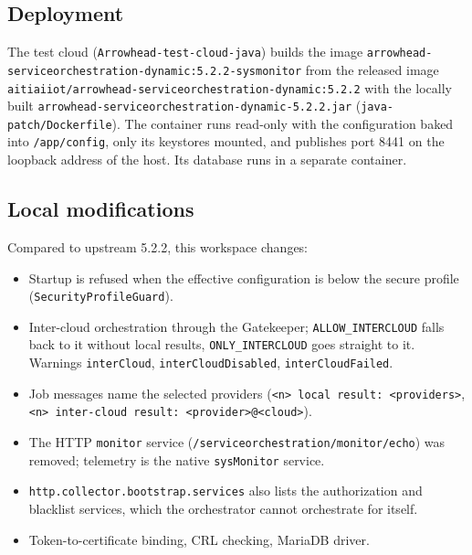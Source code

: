\documentclass[a4paper]{arrowhead}
\begin{document}
\subsection{Deployment}

The test cloud (\texttt{Arrowhead-test-cloud-java}) builds the image \texttt{arrowhead-\allowbreak{}serviceorchestration-\allowbreak{}dynamic:5.\allowbreak{}2.\allowbreak{}2-\allowbreak{}sysmonitor} from the released image \texttt{aitiaiiot/\allowbreak{}arrowhead-\allowbreak{}serviceorchestration-\allowbreak{}dynamic:5.\allowbreak{}2.\allowbreak{}2} with the locally built \texttt{arrowhead-\allowbreak{}serviceorchestration-\allowbreak{}dynamic-\allowbreak{}5.\allowbreak{}2.\allowbreak{}2.\allowbreak{}jar} (\texttt{java-patch/Dockerfile}). The container runs read-only with the configuration baked into \texttt{/app/config}, only its keystores mounted, and publishes port 8441 on the loopback address of the host. Its database runs in a separate container.

\subsection{Local modifications}
\label{sec:local}

Compared to upstream 5.2.2, this workspace changes:
\begin{itemize}
  \item Startup is refused when the effective configuration is below the secure profile (\texttt{Security\allowbreak{}Profile\allowbreak{}Guard}).
  \item Inter-cloud orchestration through the Gatekeeper; \texttt{ALLOW\_\allowbreak{}INTERCLOUD} falls back to it without local results, \texttt{ONLY\_\allowbreak{}INTERCLOUD} goes straight to it. Warnings \texttt{interCloud}, \texttt{interCloudDisabled}, \texttt{interCloudFailed}.
  \item Job messages name the selected providers (\texttt{\textless{}n\textgreater{} local result: \textless{}providers\textgreater{}}, \texttt{\textless{}n\textgreater{} inter-\allowbreak{}cloud result: \textless{}provider\textgreater{}@\textless{}cloud\textgreater{}}).
  \item The HTTP \texttt{monitor} service (\texttt{/\allowbreak{}serviceorchestration/\allowbreak{}monitor/\allowbreak{}echo}) was removed; telemetry is the native \texttt{sysMonitor} service.
  \item \texttt{http.\allowbreak{}collector.\allowbreak{}bootstrap.\allowbreak{}services} also lists the authorization and blacklist services, which the orchestrator cannot orchestrate for itself.
  \item Token-to-certificate binding, CRL checking, MariaDB driver.
\end{itemize}
\end{document}
